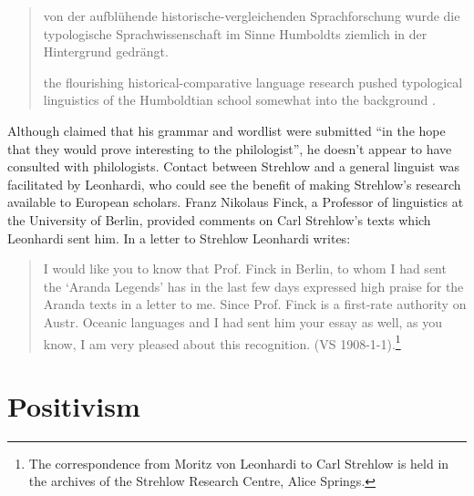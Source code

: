 \documentclass[english,output=paper,colorlinks,citecolor=brown]{../langscibook}
\begin{document}
\begin{quote}
    von der aufblühende historische-vergleichenden Sprachforschung wurde die typologische Sprachwissenschaft im Sinne Humboldts ziemlich in der Hintergrund gedrängt. 
    
    the flourishing historical-comparative language research pushed typological linguistics of the Humboldtian school somewhat into the background \citep[216]{Deeters1937}.  
\end{quote}

Although \citet[1]{Kempe1891} claimed that his grammar and wordlist were submitted ``in the hope that they would prove interesting to the philologist'', he doesn’t appear to have consulted with philologists. Contact between Strehlow and a general linguist was facilitated by Leonhardi, who could see the benefit of making Strehlow’s research available to European scholars. Franz Nikolaus Finck, a Professor of linguistics at the University of Berlin, provided comments on Carl Strehlow’s texts which Leonhardi sent him. In a letter to Strehlow Leonhardi writes: 

\begin{quote}
    I would like you to know that Prof. Finck in Berlin, to whom I had sent the ‘Aranda Legends’ has in the last few days expressed high praise for the Aranda texts in a letter to me. Since Prof. Finck is a first-rate authority on Austr. Oceanic languages and I had sent him your essay as well, as you know, I am very pleased about this recognition.  (VS 1908-1-1).\footnote{The correspondence from Moritz von Leonhardi to Carl Strehlow is held in the archives of the Strehlow Research Centre, Alice Springs.}
\end{quote}

\section{Positivism} 
\end{document}

